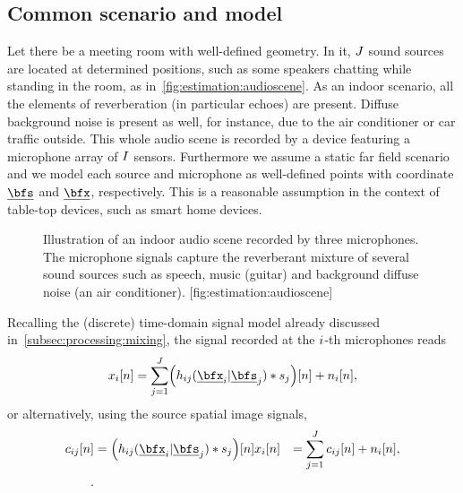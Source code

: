 \subsection{Common scenario and model}
Let there be a meeting room with well-defined geometry.
In it, $J$ sound sources are located at determined positions, such as some speakers chatting while standing in the room, as in~\cref{fig:estimation:audioscene}.
As an indoor scenario, all the elements of reverberation (in particular echoes) are present.
Diffuse background noise is present as well, for instance, due to the air conditioner or car traffic outside.
This whole audio scene is recorded by a device featuring a microphone array of $I$ sensors.
Furthermore we assume a static far field scenario and we model each source and microphone as well-defined points with coordinate $\positionSource$ and $\positionMicrophone$, respectively.
This is a reasonable assumption in the context of table-top devices, such as smart home devices.
\begin{figure}[]
    \begin{sidecaption}{%
        Illustration of an indoor audio scene recorded by three microphones.
        The microphone signals capture the reverberant mixture of several sound sources such as speech, music (guitar) and background diffuse noise (an air conditioner).
    }[fig:estimation:audioscene]
    \centering
    \resizebox{\linewidth}{!}{}
    \end{sidecaption}
\end{figure}
Recalling the (discrete) time-domain signal model already discussed in~\cref{subsec:processing:mixing}, the signal recorded at the $i$-th microphones reads
\begin{equation}
    \label{eq:application:mix}
    \mic_\idxMic[n] = \sum_{\idxSrc = 1}^{\numSrcs}
        \kparen{\flt_{\idxMicSrc}( \positionMicrophone_{\idxMic}  | \positionSource_{\idxSrc}) \convDis \src_{\idxSrc}} [n] + \nse_\idxMic[n]
    ,
\end{equation}
or alternatively, using the source spatial image signals,
\begin{equation}
    \label{eq:application:mix_img}
    \begin{aligned}
        \img_{\idxMicSrc}[n]  &= \kparen{\flt_{\idxMicSrc}( \positionMicrophone_{\idxMic}  | \positionSource_{\idxSrc}) \convDis \src_{\idxSrc}}[n]
        \mic_\idxMic[n]     &= \sum_{\idxSrc = 1}^{\numSrcs} \img_{\idxMicSrc}[n] + \nse_\idxMic[n],\\
        .
    \end{aligned}
\end{equation}
